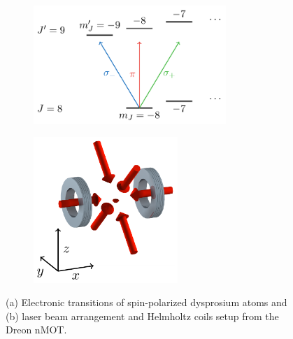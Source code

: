 \begin{figure}[!ht]
    \centering
    \begin{subfigure}[b]{0.48\linewidth}
        \centering
        \includegraphics[width=0.8\textwidth]{USPSC-img/Dy-Dreon-transitions.png}
        \label{fig:Dy-Dreon-electronic-transitions}
    \end{subfigure}
    \hfill
    \begin{subfigure}[b]{0.48\linewidth}
        \centering
        \includegraphics[width=0.6\textwidth]{USPSC-img/Dreon-setup.png}
        \label{fig:Dreon-setup}
    \end{subfigure}
    \vspace{10px}
    \caption{(a) Electronic transitions of spin-polarized dysprosium atoms and (b) laser beam arrangement and Helmholtz coils setup from the Dreon nMOT.}
\end{figure}

